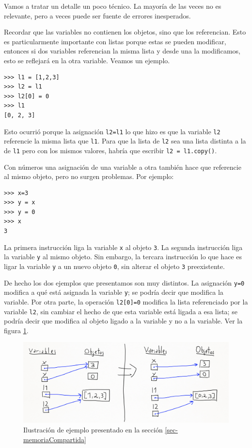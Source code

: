 \documentclass[a4paper, 12pt]{report}
\theoremstyle{definition}
\begin{document}
Vamos a tratar un detalle un poco técnico. La mayoría de las veces no es relevante, pero a veces puede ser fuente de errores inesperados.

Recordar que las variables no contienen los objetos, sino que los referencian. Esto es particularmente importante con listas porque estas se pueden modificar, entonces si dos variables referencian la misma lista y desde una la modificamos, esto se reflejará en la otra variable. Veamos un ejemplo.
\begin{verbatim}
>>> l1 = [1,2,3]
>>> l2 = l1
>>> l2[0] = 0
>>> l1
[0, 2, 3]
\end{verbatim}
Esto ocurrió porque la asignación {\tt l2=l1} lo que hizo es que la variable {\tt l2} referencie la misma lista que {\tt l1}. Para que la lista de {\tt l2} sea una lista distinta a la de {\tt l1} pero con los mismos valores, habría que escribir {\tt l2 = l1.copy()}.

Con números una asignación de una variable a otra también hace que referencie al mismo objeto, pero no surgen problemas. Por ejemplo:
\begin{verbatim}
>>> x=3
>>> y = x
>>> y = 0
>>> x
3
\end{verbatim}
La primera instrucción liga la variable {\tt x} al objeto {\tt 3}. La segunda instrucción liga la variable {\tt y} al mismo objeto. Sin embargo, la tercara instrucción lo que hace es ligar la variable {\tt y} a un nuevo objeto {\tt 0}, sin alterar el objeto {\tt 3} preexistente.

De hecho los dos ejemplos que presentamos son muy distintos. La asignación {\tt y=0} modifica a qué está asignada la variable {\tt y}; se podría decir que modifica la variable. Por otra parte, la operación {\tt l2[0]=0} modifica la lista referenciado por la variable {\tt l2}, sin cambiar el hecho de que esta variable está ligada a esa lista; se podría decir que modifica al objeto ligado a la variable y no a la variable. Ver la figura \ref{fig-ejemploVarMem}.

\begin{figure}
	\centering
	\includegraphics[scale=0.3]{ejemploVarMem.png}
	\caption{Ilustración de ejemplo presentado en la sección \ref{sec-memoriaCompartida}}
	\label{fig-ejemploVarMem}
\end{figure}
\end{document}
